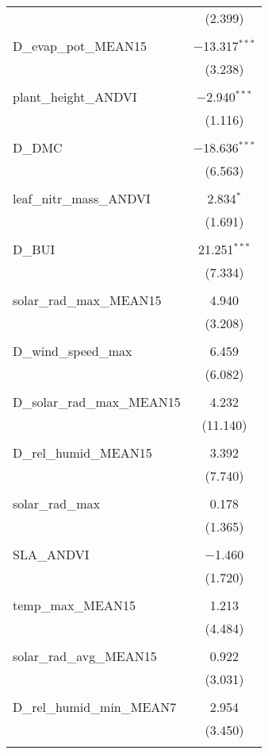 \begin{table}[!htbp]
\begin{tabular}{@{\extracolsep{5pt}}lc}
  & (2.399) \\ 
  & \\ 
 D\_evap\_pot\_MEAN15 & $-$13.317$^{***}$ \\ 
  & (3.238) \\ 
  & \\ 
 plant\_height\_ANDVI & $-$2.940$^{***}$ \\ 
  & (1.116) \\ 
  & \\ 
 D\_DMC & $-$18.636$^{***}$ \\ 
  & (6.563) \\ 
  & \\ 
 leaf\_nitr\_mass\_ANDVI & 2.834$^{*}$ \\ 
  & (1.691) \\ 
  & \\ 
 D\_BUI & 21.251$^{***}$ \\ 
  & (7.334) \\ 
  & \\ 
 solar\_rad\_max\_MEAN15 & 4.940 \\ 
  & (3.208) \\ 
  & \\ 
 D\_wind\_speed\_max & 6.459 \\ 
  & (6.082) \\ 
  & \\ 
 D\_solar\_rad\_max\_MEAN15 & 4.232 \\ 
  & (11.140) \\ 
  & \\ 
 D\_rel\_humid\_MEAN15 & 3.392 \\ 
  & (7.740) \\ 
  & \\ 
 solar\_rad\_max & 0.178 \\ 
  & (1.365) \\ 
  & \\ 
 SLA\_ANDVI & $-$1.460 \\ 
  & (1.720) \\ 
  & \\ 
 temp\_max\_MEAN15 & 1.213 \\ 
  & (4.484) \\ 
  & \\ 
 solar\_rad\_avg\_MEAN15 & 0.922 \\ 
  & (3.031) \\ 
  & \\ 
 D\_rel\_humid\_min\_MEAN7 & 2.954 \\ 
  & (3.450) \\ 
  & \\ 

\end{tabular}
\end{table}
